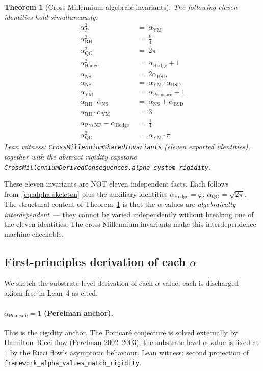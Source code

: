 \documentclass[11pt,a4paper]{article}
\newtheorem{theorem}{Theorem}[section]
\theoremstyle{definition}
\theoremstyle{remark}
\newcommand{\alphaRH}{\alpha_{\mathrm{RH}}}
\newcommand{\alphaYM}{\alpha_{\mathrm{YM}}}
\newcommand{\alphaP}{\alpha_{\mathrm{Poincar\acute{e}}}}
\newcommand{\alphaBSD}{\alpha_{\mathrm{BSD}}}
\newcommand{\alphaNS}{\alpha_{\mathrm{NS}}}
\newcommand{\alphaH}{\alpha_{\mathrm{Hodge}}}
\newcommand{\alphaNP}{\alpha_{\mathrm{P\,vs\,NP}}}
\newcommand{\alphaQG}{\alpha_{\mathrm{QG}}}
\newcommand{\lean}[1]{\texttt{\small #1}}
\begin{document}
\begin{theorem}[Cross-Millennium algebraic invariants]\label{thm:eleven-invariants}
The following eleven identities hold simultaneously:
\begin{align}
\alpha_{P}^{2} \;&=\; \alphaYM
\label{eq:inv1}\\
\alphaRH^{2} \;&=\; \tfrac{9}{4}
\label{eq:inv2}\\
\alphaQG^{2} \;&=\; 2\pi
\label{eq:inv3}\\
\alphaH^{2} \;&=\; \alphaH + 1
\label{eq:inv4}\\
\alphaNS \;&=\; 2 \alphaBSD
\label{eq:inv5}\\
\alphaNS \;&=\; \alphaYM \cdot \alphaBSD
\label{eq:inv6}\\
\alphaYM \;&=\; \alphaP + 1
\label{eq:inv7}\\
\alphaRH \cdot \alphaNS \;&=\; \alphaNS + \alphaBSD
\label{eq:inv8}\\
\alphaRH \cdot \alphaYM \;&=\; 3
\label{eq:inv9}\\
\alphaNP - \alphaH \;&=\; \tfrac{1}{4}
\label{eq:inv10}\\
\alphaQG^{2} \;&=\; \alphaYM \cdot \pi
\label{eq:inv11}
\end{align}
Lean witness:
\lean{CrossMillenniumSharedInvariants} (eleven exported identities),
together with the abstract rigidity capstone
\lean{CrossMillenniumDerivedConsequences.alpha\_system\_rigidity}.
\end{theorem}

These eleven invariants are NOT eleven independent facts. Each
follows from~\eqref{eq:alpha-skeleton} plus the auxiliary identities
$\alphaH = \varphi$, $\alphaQG = \sqrt{2\pi}$. The structural
content of Theorem~\ref{thm:eleven-invariants} is that the
$\alpha$-values are \emph{algebraically interdependent}~--- they
cannot be varied independently without breaking one of the eleven
identities. The cross-Millennium invariants make this
interdependence machine-checkable.

\subsection{First-principles derivation of each $\alpha$}

We sketch the substrate-level derivation of each $\alpha$-value;
each is discharged axiom-free in Lean~4 as cited.

\paragraph{$\alphaP = 1$ (Perelman anchor).}
This is the rigidity anchor. The Poincar\'e conjecture is solved
externally by Hamilton--Ricci flow (Perelman 2002--2003); the
substrate-level $\alpha$-value is fixed at $1$ by the Ricci flow's
asymptotic behaviour. Lean witness: second projection of
\lean{framework\_alpha\_values\_match\_rigidity}.
\end{document}
